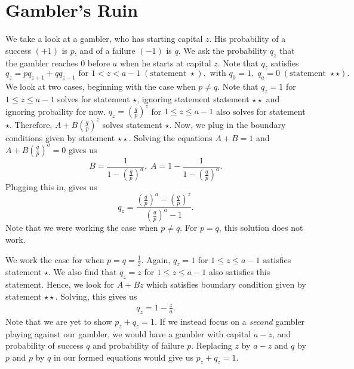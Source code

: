 \documentclass[15pt,a4paper]{book}
\theoremstyle{definition}
\begin{document}
\section{Gambler's Ruin}
We take a look at a gambler, who has starting capital $z$. His probability of a success $(+1)$ is $p$, and of a failure $(-1)$ is $q$. We ask the probability $q_{z}$ that the gambler reaches $0$ before $a$ when he starts at capital $z$. Note that $q_{z}$ satisfies
\begin{equation}
    q_{z} = pq_{z+1}+qq_{z-1} \text{ for } 1 < z < a-1\; (\text{statement }\star), \text{ with } q_{0} = 1,\; q_{a} = 0\; (\text{statement }\star \star).
\end{equation}
We look at two cases, beginning with the case when $p \neq q$. Note that $q_{z} = 1$ for $1 \leq z \leq a-1$ solves for statement $\star$, ignoring statement statement $\star \star$ and ignoring probaility for now. $q_{z} = (\frac{q}{p})^{z}$ for $1 \leq z \leq a-1$ also solves for statement $\star$. Therefore, $A+B(\frac{q}{p})^{z}$ solves statement $\star$. Now, we plug in the boundary conditions given by statement $\star \star$. Solving the equations $A+B = 1$ and $A + B(\frac{q}{p})^{a} = 0$ gives us
\begin{equation}
    B = \frac{1}{1-(\frac{q}{p})^{a}},\; A = 1 - \frac{1}{1-(\frac{q}{p})^{a}}.
\end{equation}
Plugging this in, gives us
\begin{equation}
    q_{z} = \frac{(\frac{q}{p})^{a} - (\frac{q}{p})^{z}}{(\frac{q}{p})^{a} - 1}.
\end{equation}
Note that we were working the case when $p \neq q$. For $p = q$, this solution does not work.

We work the case for when $p = q = \frac{1}{2}$. Again, $q_{z} = 1$ for $1 \leq z \leq a-1$ satisfies statement $\star$. We also find that $q_{z} = z$ for $1 \leq z \leq a-1$ also satisfies this statement. Hence, we look for $A+Bz$ which satisfies boundary condition given by statement $\star \star$. Solving, this gives us
\begin{align}
    q_{z} = 1 - \frac{z}{a}.
\end{align}
Note that we are yet to show $p_{z} + q_{z} = 1$. If we instead focus on a \textit{second} gambler playing against our gambler, we would have a gambler with capital $a-z$, and probability of success $q$ and probability of failure $p$. Replacing $z$ by $a-z$ and $q$ by $p$ and $p$ by $q$ in our formed equations would give us $p_{z} + q_{z} = 1$.
\end{document}
